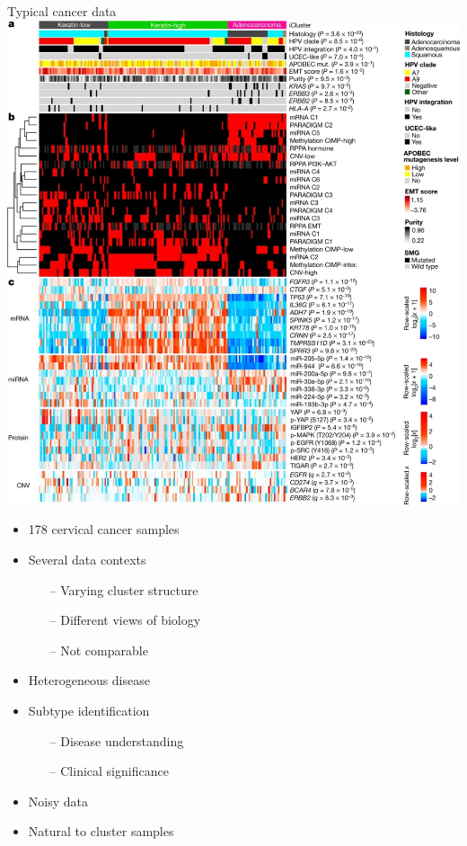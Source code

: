 \documentclass[t, final]{beamer}
\begin{document}
\begin{frame}{}
%
\begin{columns}[t]
\begin{column}{.32\linewidth}
\begin{block}{Typical cancer data}
  \includegraphics[width=\textwidth]{Figures/cervical-clusters}
  {\small {}}

  \begin{itemize}
    \item 178 cervical cancer samples
    \item Several data contexts
      \begin{itemize}
        \item[--] Varying cluster structure
        \item[--] Different views of biology
        \item[--] Not comparable
      \end{itemize}
    \item Heterogeneous disease
    \item Subtype identification
      \begin{itemize}
        \item[--] Disease understanding
        \item[--] Clinical significance
      \end{itemize}
    \item Noisy data
    \item Natural to cluster samples
  \end{itemize}
\end{block}


\end{column}
\end{columns}
\end{frame}
\end{document}
